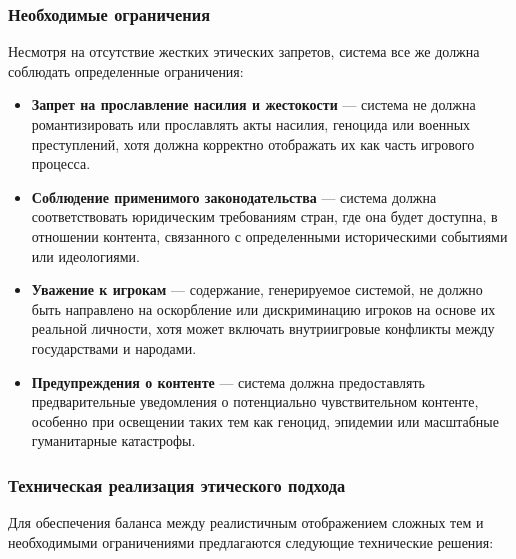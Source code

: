 \subsubsection{Необходимые ограничения}

Несмотря на отсутствие жестких этических запретов, система все же должна соблюдать определенные ограничения:

\begin{itemize}
    \item \textbf{Запрет на прославление насилия и жестокости} — система не должна романтизировать или прославлять акты насилия, геноцида или военных преступлений, хотя должна корректно отображать их как часть игрового процесса.

    \item \textbf{Соблюдение применимого законодательства} — система должна соответствовать юридическим требованиям стран, где она будет доступна, в отношении контента, связанного с определенными историческими событиями или идеологиями.

    \item \textbf{Уважение к игрокам} — содержание, генерируемое системой, не должно быть направлено на оскорбление или дискриминацию игроков на основе их реальной личности, хотя может включать внутриигровые конфликты между государствами и народами.

    \item \textbf{Предупреждения о контенте} — система должна предоставлять предварительные уведомления о потенциально чувствительном контенте, особенно при освещении таких тем как геноцид, эпидемии или масштабные гуманитарные катастрофы.
\end{itemize}

\subsubsection{Техническая реализация этического подхода}

Для обеспечения баланса между реалистичным отображением сложных тем и необходимыми ограничениями предлагаются следующие технические решения:

